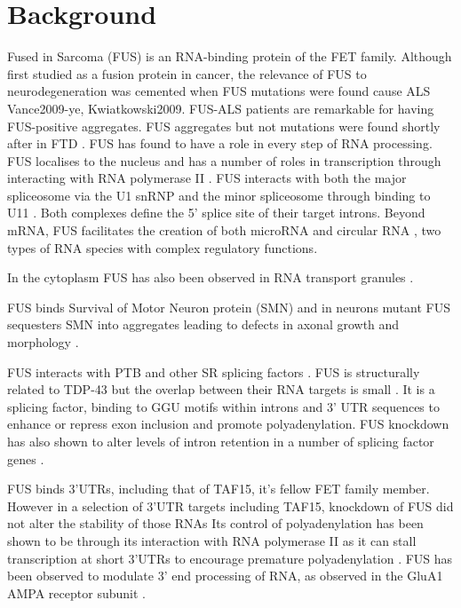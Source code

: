 \section{Background}



Fused in Sarcoma (FUS) is an RNA-binding protein of the FET family.
Although first studied as a fusion protein in cancer, the relevance of FUS to neurodegeneration was cemented when FUS mutations were found cause ALS {Vance2009-ye, Kwiatkowski2009}. FUS-ALS patients are remarkable for having FUS-positive aggregates.
FUS aggregates but not mutations were found shortly after in FTD  \citep{Neumann2009}.
FUS has found to have a role in every step of RNA processing.
FUS localises to the nucleus and has a number of roles in transcription through interacting with RNA polymerase II \citep{Schwartz2012}.
FUS interacts with both the major spliceosome via the U1 snRNP \citep{Sun2015a, Yu2015} and the minor spliceosome through binding to U11 \citep{Reber2016}. Both complexes define the 5' splice site of their target introns.
Beyond mRNA, FUS facilitates the creation of both microRNA \citep{Morlando2012} and circular RNA \citep{Errichelli2017}, two types of RNA species with complex regulatory functions.

In the cytoplasm FUS has also been observed in RNA transport granules \citep{Kanai2004, Fujii2005}.


FUS binds Survival of Motor Neuron protein (SMN) \citep{Yamazaki2012,Groen2013} and in neurons mutant FUS sequesters SMN into aggregates leading to defects in axonal growth and morphology \citep{Groen2013}.

FUS interacts with PTB and other SR splicing factors \citep{Yang1998,Meissner2003}.
FUS is structurally related to TDP-43 but the overlap between their RNA targets is small \citep{Lagier-Tourenne2012-wa,Rogelj2012,Colombrita2012, Honda2014}. 
It is a splicing factor, binding to GGU motifs within introns and 3' UTR sequences \citep{Rogelj2012,Lagier-Tourenne2012-wa} to enhance or repress exon inclusion and promote polyadenylation.
FUS knockdown has also shown to alter levels of intron retention in a number of splicing factor genes \citep{VanBlitterswijk2013, Nakaya2013}.


FUS binds 3'UTRs, including that of TAF15, it's fellow FET family member. However in a selection of 3'UTR targets including TAF15, knockdown of FUS did not alter the stability of those RNAs \citep{Colombrita2012}
Its control of polyadenylation has been shown to be through its interaction with RNA polymerase II as it can stall transcription at short 3'UTRs to encourage premature polyadenylation \citep{Masuda2015}. 
FUS has been observed to modulate 3' end processing of RNA, as observed in the GluA1 AMPA receptor subunit \citep{Udagawa2015}. 


